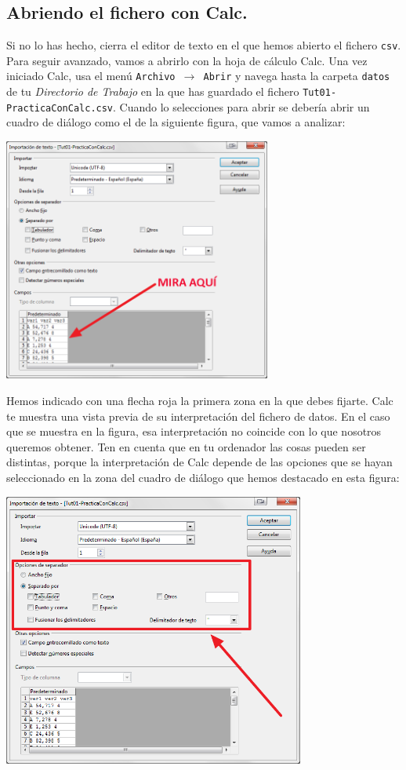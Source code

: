 \documentclass[10pt,a4paper]{article}\usepackage[]{graphicx}\usepackage[]{color}
\begin{document}
\subsection{Abriendo el fichero con Calc.}

Si no lo has hecho, cierra el editor de texto en el que hemos abierto el fichero {\tt csv}. Para
seguir avanzado, vamos a abrirlo con la hoja de cálculo Calc. Una vez iniciado Calc, usa el menú
{\tt Archivo $\to$ Abrir} y navega hasta la carpeta {\tt datos} de tu {\em Directorio de Trabajo} en 
la que has guardado el fichero {\tt Tut01-PracticaConCalc.csv}. Cuando lo selecciones para abrir se debería abrir un cuadro de diálogo
como el de la siguiente figura, que vamos a analizar:
        \begin{center}
        \includegraphics[height=8cm]{../fig/Tut00-Calc-csv-01.png}
        \end{center}
Hemos indicado con una flecha roja la primera zona en la que debes fijarte. Calc te muestra una
vista previa de su interpretación del fichero de datos. En el caso que se muestra en la figura, esa
interpretación no coincide con lo que nosotros queremos obtener. Ten en cuenta que en tu ordenador
las cosas pueden ser distintas, porque la interpretación de Calc depende de las opciones que se
hayan seleccionado en la zona del cuadro de diálogo que hemos destacado en esta figura:
        \begin{center}
        \includegraphics[height=9cm]{../fig/Tut00-Calc-csv-02.png}
        \end{center}
\end{document}
